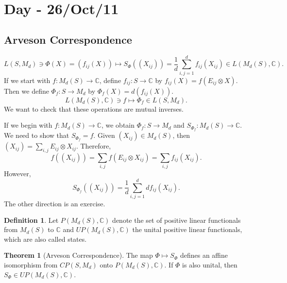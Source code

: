 \documentclass[12pt]{article}
\theoremstyle{definition}
\newtheorem*{theorem}{Theorem}
\newtheorem*{definition}{Definition}
\newcommand{\C}{\mathbb{C}}
\begin{document}
\section{Day - 26/Oct/11}

\subsection{Arveson Correspondence}

\[
L(S,M_d) \ni \Phi(X)=(f_{ij}(X)) \mapsto S_\Phi((X_{ij}))=\frac{1}{d}\sum_{i,j=1}^d f_{ij}(X_{ij}) \in L(M_d(S),\C).
\]
If we start with $f:M_d(S) \to \C$, define $f_{ij}:S \to \C$ by $f_{ij}(X)=f(E_{ij} \otimes X)$. Then we define $\Phi_f:S \to M_d$ by $\Phi_f(X)=d(f_{ij}(X))$.
\[
L(M_d(S),\C) \ni f \mapsto \Phi_f \in L(S,M_d).
\]
We want to check that these operations are mutual inverses.

If we begin with $f:M_d(S) \to \C$, we obtain $\Phi_f:S \to M_d$ and $S_{\Phi_f}:M_d(S) \to \C$. We need to show that $S_{\Phi_f}=f$. Given $(X_{ij}) \in M_d(S)$, then $(X_{ij})=\sum_{i,j} E_{ij}\otimes X_{ij}$. Therefore,
\[
f((X_{ij}))=\sum_{i,j} f(E_{ij} \otimes X_{ij}) = \sum_{i,j} f_{ij}(X_{ij}).
\]
However,
\[
S_{\Phi_f}((X_{ij}))=\frac{1}{d}\sum_{i,j=1}^d df_{ij}(X_{ij}).
\]
The other direction is an exercise.

\begin{definition}
Let $P(M_d(S),\C)$ denote the set of positive linear functionals from $M_d(S)$ to $\C$ and $UP(M_d(S),\C)$ the unital positive linear functionals, which are also called states.
\end{definition}

\begin{theorem}[Arveson Correspondence]
The map $\Phi \mapsto S_\Phi$ defines an affine isomorphism from $CP(S,M_d)$ onto $P(M_d(S),\C)$. If $\Phi$ is also unital, then $S_\Phi \in UP(M_d(S),\C)$.
\end{theorem}
\end{document}
